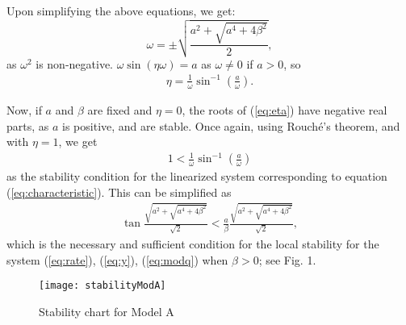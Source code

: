 \documentclass[conference]{IEEEtran}
\begin{document}
Upon simplifying the above equations, we get:
\begin{equation}
\label{eq:omega}
\omega = \pm \sqrt{\frac{a^{2} + \sqrt{a^{4} + 4\beta^{2}}}{2}},
\end{equation}
as $\omega^{2}$ is non-negative. $\omega\sin\left(\eta\omega\right) = a $ as 
$\omega \neq 0$ if $a > 0$, so
\begin{equation}
\begin{aligned}
\eta = \frac{1}{\omega}\sin^{-1}\left(\frac{a}{\omega}\right).
\end{aligned}
\end{equation}

Now, if $a$ and $\beta$ are fixed and $\eta = 0$, the roots of (\ref{eq:eta}) have negative real parts, as $a$ is positive, and are stable. Once again, using Rouch\'{e}'s theorem, and with $\eta = 1$, we get
\begin{equation}
\begin{aligned}
1 < \frac{1}{\omega}\sin^{-1}\left(\frac{a}{\omega}\right)
\end{aligned}
\end{equation}
as the stability condition for the linearized system corresponding 
to equation (\ref{eq:characteristic}). This can be simplified as
\begin{equation}
\begin{aligned}
\tan\frac{\sqrt{a^{2} + \sqrt{a^{4}+4\beta^{2}}}}{\sqrt{2}} < \frac{a}{\beta}\frac{\sqrt{a^{2} + \sqrt{a^{4}+4\beta^{2}}}}{\sqrt{2}},
\end{aligned}
\end{equation}
which is the necessary and sufficient condition for the local stability for the system  
(\ref{eq:rate}), (\ref{eq:y}), (\ref{eq:modq}) when $\beta > 0$; see Fig. 1.
\begin{figure}[t!]
\label{stableA}
\centering
{}
\texttt{[image: stabilityModA]}
\caption{Stability chart for Model A}
\end{figure} 
\end{document}
